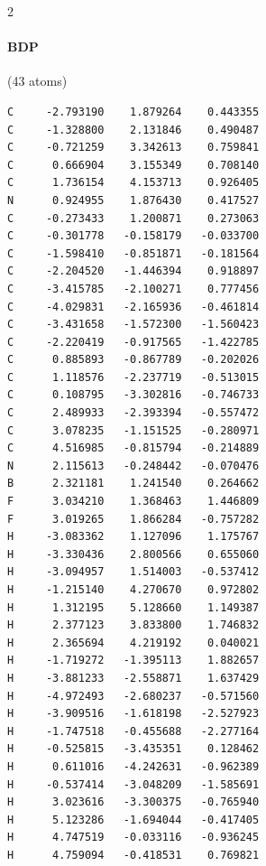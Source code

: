 \begin{multicols}{2}
\paragraph{BDP} (43 atoms)
{\scriptsize\linespread{1}\selectfont\begin{verbatim}
C     -2.793190    1.879264    0.443355
C     -1.328800    2.131846    0.490487
C     -0.721259    3.342613    0.759841
C      0.666904    3.155349    0.708140
C      1.736154    4.153713    0.926405
N      0.924955    1.876430    0.417527
C     -0.273433    1.200871    0.273063
C     -0.301778   -0.158179   -0.033700
C     -1.598410   -0.851871   -0.181564
C     -2.204520   -1.446394    0.918897
C     -3.415785   -2.100271    0.777456
C     -4.029831   -2.165936   -0.461814
C     -3.431658   -1.572300   -1.560423
C     -2.220419   -0.917565   -1.422785
C      0.885893   -0.867789   -0.202026
C      1.118576   -2.237719   -0.513015
C      0.108795   -3.302816   -0.746733
C      2.489933   -2.393394   -0.557472
C      3.078235   -1.151525   -0.280971
C      4.516985   -0.815794   -0.214889
N      2.115613   -0.248442   -0.070476
B      2.321181    1.241540    0.264662
F      3.034210    1.368463    1.446809
F      3.019265    1.866284   -0.757282
H     -3.083362    1.127096    1.175767
H     -3.330436    2.800566    0.655060
H     -3.094957    1.514003   -0.537412
H     -1.215140    4.270670    0.972802
H      1.312195    5.128660    1.149387
H      2.377123    3.833800    1.746832
H      2.365694    4.219192    0.040021
H     -1.719272   -1.395113    1.882657
H     -3.881233   -2.558871    1.637429
H     -4.972493   -2.680237   -0.571560
H     -3.909516   -1.618198   -2.527923
H     -1.747518   -0.455688   -2.277164
H     -0.525815   -3.435351    0.128462
H      0.611016   -4.242631   -0.962389
H     -0.537414   -3.048209   -1.585691
H      3.023616   -3.300375   -0.765940
H      5.123286   -1.694044   -0.417405
H      4.747519   -0.033116   -0.936245
H      4.759094   -0.418531    0.769821
\end{verbatim}}

\end{multicols}
